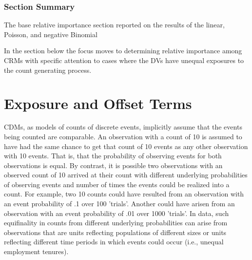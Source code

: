 \documentclass[ShortAfour,times,sageapa]{sagej}
\begin{document}
	\subsubsection{Section Summary}
	
	The base relative importance section reported on the results of the linear, Poisson, and negative Binomial
	
	
	In the section below the focus moves to determining relative importance among CRMs with specific attention to cases where the DVs have unequal exposures to the count generating process.
	
	
	
\section{Exposure and Offset Terms}
	
	CDMs, as models of counts of discrete events, implicitly assume that the events being counted are comparable.  
	An observation with a count of 10 is assumed to have had the same chance to get that count of 10 events as any other observation with 10 events.  
	That is, that the probability of observing events for both observations is equal.
	By contrast, it is possible two observations with an observed count of 10 arrived at their count with different underlying probabilities of observing events and number of times the events could be realized into a count.  
	For example, two 10 counts could have resulted from an observation with an event probability of .1 over 100 'trials'.  
	Another could have arisen from an observation with an event probability of .01 over 1000 'trials'.  
	In data, such equifinality in counts from different underlying probabilities can arise from observations that are units reflecting populations of different sizes or units reflecting different time periods in which events could occur (i.e., unequal employment tenures).
	
\end{document}
